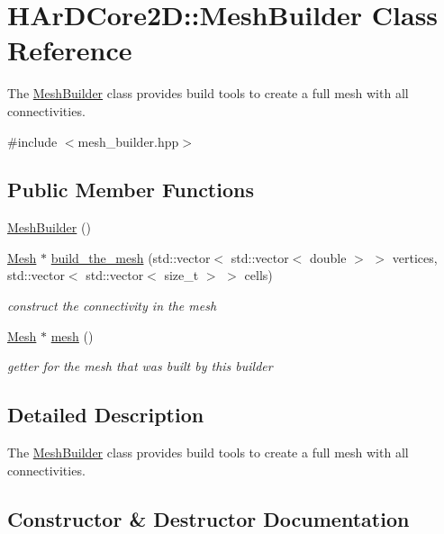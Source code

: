 \hypertarget{classHArDCore2D_1_1MeshBuilder}{}\section{H\+Ar\+D\+Core2D\+:\+:Mesh\+Builder Class Reference}
\label{classHArDCore2D_1_1MeshBuilder}


The \hyperlink{classHArDCore2D_1_1MeshBuilder}{Mesh\+Builder} class provides build tools to create a full mesh with all connectivities.  




{\ttfamily \#include $<$mesh\+\_\+builder.\+hpp$>$}

\subsection*{Public Member Functions}
\begin{DoxyCompactItemize}
\item 
\hyperlink{classHArDCore2D_1_1MeshBuilder_a13fe22fd14a85f789dc9d7d4a8d2419d}{Mesh\+Builder} ()
\item 
\hyperlink{classHArDCore2D_1_1Mesh}{Mesh} $\ast$ \hyperlink{classHArDCore2D_1_1MeshBuilder_a1c392d732ae962e5355786ff04d19024}{build\+\_\+the\+\_\+mesh} (std\+::vector$<$ std\+::vector$<$ double $>$ $>$ vertices, std\+::vector$<$ std\+::vector$<$ size\+\_\+t $>$ $>$ cells)
\begin{DoxyCompactList}\small\item\em construct the connectivity in the mesh \end{DoxyCompactList}\item 
\hyperlink{classHArDCore2D_1_1Mesh}{Mesh} $\ast$ \hyperlink{group__Mesh_ga0cf325394142e077ffe05dd723cdeddc}{mesh} ()
\begin{DoxyCompactList}\small\item\em getter for the mesh that was built by this builder \end{DoxyCompactList}\end{DoxyCompactItemize}


\subsection{Detailed Description}
The \hyperlink{classHArDCore2D_1_1MeshBuilder}{Mesh\+Builder} class provides build tools to create a full mesh with all connectivities. 

\subsection{Constructor \& Destructor Documentation}
\mbox{\label{classHArDCore2D_1_1MeshBuilder_a13fe22fd14a85f789dc9d7d4a8d2419d}} 
